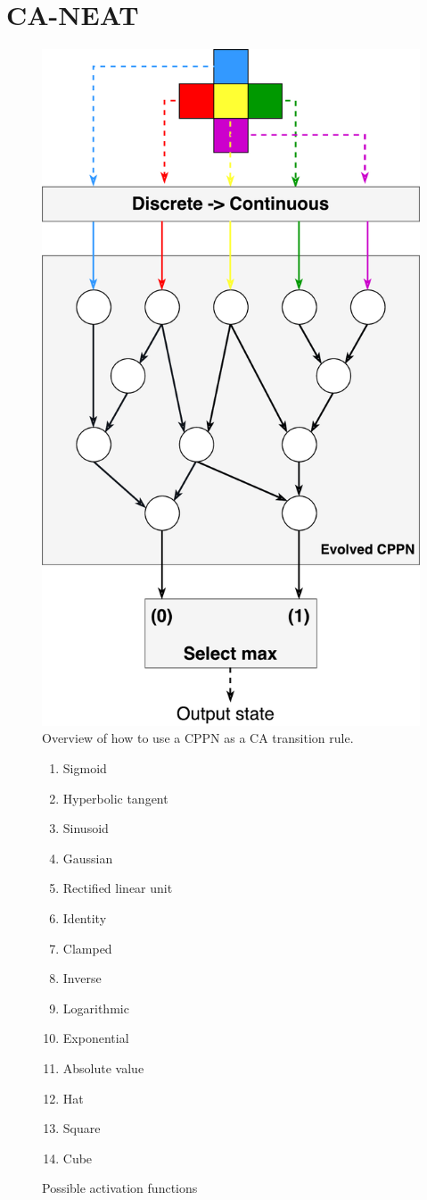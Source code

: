 \section{CA-NEAT}
\begin{figure}
\centering
\includegraphics[width=.7\columnwidth]{fig/CA_NEAT}
\caption{
    Overview of how to use a CPPN as a CA transition rule.
    }
\label{fig:CA_NEAT}
\end{figure}

\begin{figure}
\centering
\begin{multicols}{3}
\begin{enumerate}
    \item Sigmoid
    \item Hyperbolic tangent
    \item Sinusoid
    \item Gaussian
    \item Rectified linear unit
    \item Identity
    \item Clamped
    \item Inverse
    \item Logarithmic
    \item Exponential
    \item Absolute value
    \item Hat
    \item Square
    \item Cube
\end{enumerate}
\end{multicols}
\caption{Possible activation functions}
\label{fig:activations}
\end{figure}

